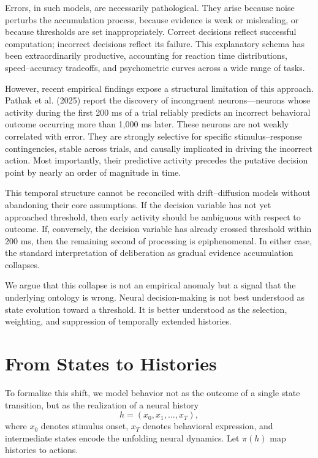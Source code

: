 \documentclass[11pt]{article}
\begin{document}
Errors, in such models, are necessarily pathological. They arise because noise perturbs the accumulation process, because evidence is weak or misleading, or because thresholds are set inappropriately. Correct decisions reflect successful computation; incorrect decisions reflect its failure. This explanatory schema has been extraordinarily productive, accounting for reaction time distributions, speed–accuracy tradeoffs, and psychometric curves across a wide range of tasks.

However, recent empirical findings expose a structural limitation of this approach. Pathak et al. (2025) report the discovery of incongruent neurons—neurons whose activity during the first 200 ms of a trial reliably predicts an incorrect behavioral outcome occurring more than 1,000 ms later. These neurons are not weakly correlated with error. They are strongly selective for specific stimulus–response contingencies, stable across trials, and causally implicated in driving the incorrect action. Most importantly, their predictive activity precedes the putative decision point by nearly an order of magnitude in time.

This temporal structure cannot be reconciled with drift–diffusion models without abandoning their core assumptions. If the decision variable has not yet approached threshold, then early activity should be ambiguous with respect to outcome. If, conversely, the decision variable has already crossed threshold within 200 ms, then the remaining second of processing is epiphenomenal. In either case, the standard interpretation of deliberation as gradual evidence accumulation collapses.

We argue that this collapse is not an empirical anomaly but a signal that the underlying ontology is wrong. Neural decision-making is not best understood as state evolution toward a threshold. It is better understood as the selection, weighting, and suppression of temporally extended histories.

\section{From States to Histories}

To formalize this shift, we model behavior not as the outcome of a single state transition, but as the realization of a neural history
\[
h = (x_0, x_1, \ldots, x_T),
\]
where $x_0$ denotes stimulus onset, $x_T$ denotes behavioral expression, and intermediate states encode the unfolding neural dynamics. Let $\pi(h)$ map histories to actions.
\end{document}
